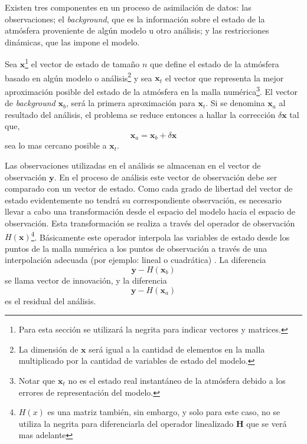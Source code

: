 Existen tres componentes en un proceso de asimilación de datos: las observaciones; el \emph{background}, que es la información sobre el estado de la atmósfera proveniente de algún modelo u otro análisis; y las restricciones dinámicas, que las impone el modelo.

Sea $\mathbf{x}$\footnote{Para esta sección se utilizará la negrita para indicar vectores y matrices.} el vector de estado de tamaño $n$ que define el estado de la atmósfera basado en algún modelo o análisis\footnote{La dimensión de $\mathbf{x}$ será igual a la cantidad de elementos en la malla multiplicado por la cantidad de variables de estado del modelo.} y sea $\mathbf{x}_t$ el vector que representa la mejor aproximación posible del estado de la atmósfera en la malla numérica\footnote{Notar que $\mathbf{x}_t$ no es el estado real instantáneo de la atmósfera debido a los errores de representación del modelo.}. El vector de \emph{background} $\mathbf{x}_b$, será la primera aproximación para $\mathbf{x}_t$. Si se denomina $\mathbf{x}_a$ al resultado del análisis, el problema se reduce entonces a hallar la corrección $\delta \mathbf{x}$ tal que,
\begin{equation*}
	\mathbf{x}_a = \mathbf{x}_b + \delta \mathbf{x}
\end{equation*}
sea lo mas cercano posible a $\mathbf{x}_t$.

Las observaciones utilizadas en el análisis se almacenan en el vector de observación $\mathbf{y}$. En el proceso de análisis este vector de observación debe ser comparado con un vector de estado. Como cada grado de libertad del vector de estado evidentemente no tendrá su correspondiente observación, es necesario llevar a cabo una transformación desde el espacio del modelo hacia el espacio de observación. Esta transformación se realiza a través del operador de observación $H(\mathbf{x})$\footnote{$H(x)$ es una matriz también, sin embargo, y solo para este caso, no se utiliza la negrita para diferenciarla del operador linealizado $\textbf{H}$ que se verá mas adelante}. Básicamente este operador interpola las variables de estado desde los puntos de la malla numérica a los puntos de observación a través de una interpolación adecuada (por ejemplo: lineal o cuadrática) . La diferencia
\begin{equation*}
	\mathbf{y}-H(\mathbf{x}_b)
\end{equation*}
se llama vector de innovación, y la diferencia
\begin{equation*}
\mathbf{y}-H(\mathbf{x}_a)
\end{equation*}
es el residual del análisis.


